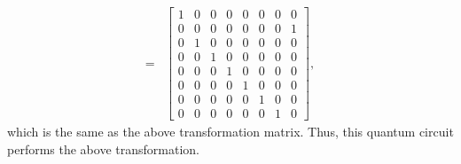 \documentclass[en]{sol-man}
\begin{document}
\begin{sol}
\begin{align}
        =&\begin{bmatrix}
            1&0&0&0&0&0&0&0\\
            0&0&0&0&0&0&0&1\\
            0&1&0&0&0&0&0&0\\
            0&0&1&0&0&0&0&0\\
            0&0&0&1&0&0&0&0\\
            0&0&0&0&1&0&0&0\\
            0&0&0&0&0&1&0&0\\
            0&0&0&0&0&0&1&0
        \end{bmatrix},
    \end{align}
    which is the same as the above transformation matrix.
    Thus, this quantum circuit performs the above transformation.
\end{sol}
\end{document}
